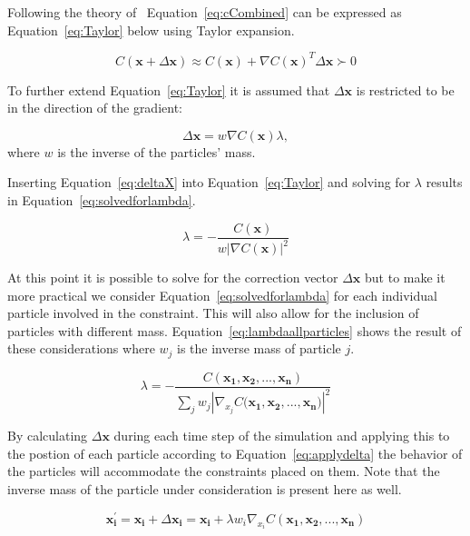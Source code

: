 Following the theory of~\cite{macklin2013position} Equation~\ref{eq:cCombined}
can be expressed as Equation~\ref{eq:Taylor} below using Taylor expansion.

\begin{equation}
\label{eq:Taylor}
C(\mathbf{x} + \Delta \mathbf{x}) \approx C(\mathbf{x}) + \nabla C(\mathbf{x})^{T} \Delta \mathbf{x} \succ 0
\end{equation}

To further extend Equation~\ref{eq:Taylor} it is assumed that $ \Delta
\mathbf{x} $ is restricted to be in the direction of the gradient:

\begin{equation}
\label{eq:deltaX}
\Delta \mathbf{x} = w \nabla C(\mathbf{x}) \lambda,
\end{equation}
 where $ w $ is the inverse of the particles' mass.

Inserting Equation~\ref{eq:deltaX} into Equation~\ref{eq:Taylor} and solving for $ \lambda $ results in Equation~\ref{eq:solvedforlambda}.

\begin{equation}
\label{eq:solvedforlambda}
\lambda = - \frac{C(\mathbf{x})}{w \left | \nabla C(\mathbf{x}) \right |^2}
\end{equation}

At this point it is possible to solve for the correction vector $ \Delta
\mathbf{x} $ but to make it more practical we consider
Equation~\ref{eq:solvedforlambda} for each individual particle involved in the
constraint. This will also allow for the inclusion of particles with different
mass. Equation~\ref{eq:lambdaallparticles} shows the result of these
considerations where $ w_{j} $ is the inverse mass of particle $ j $.

\begin{equation}
\label{eq:lambdaallparticles}
\lambda = - \frac{C(\mathbf{x_{1}}, \mathbf{x_{2}}, ..., \mathbf{x_{n}})}{\sum_{j} w_{j} \left | \nabla_{x_{j}} C(\mathbf{x_{1}, \mathbf{x_{2}}, ..., \mathbf{x_{n}})} \right |^2}
\end{equation}

By calculating $ \Delta \mathbf{x} $ during each time step of the simulation
and applying this to the postion of each particle according to
Equation~\ref{eq:applydelta} the behavior of the particles will accommodate the
constraints placed on them. Note that the inverse mass of the particle under
consideration is present here as well.

\begin{equation}
\label{eq:applydelta}
\mathbf{x_{i}^{'}} = \mathbf{x_{i}} + \Delta \mathbf{x_{i}} = \mathbf{x_{i}} + \lambda w_{i} \nabla_{x_{i}} C(\mathbf{x_{1}}, \mathbf{x_{2}}, ..., \mathbf{x_{n}})
\end{equation}

